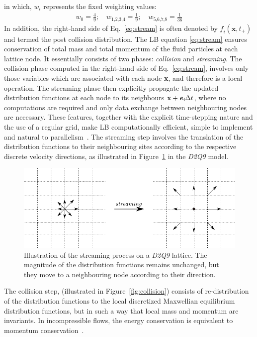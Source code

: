 in which, $\textit{w}_{\textit{i}}$ represents the fixed weighting values:
\begin{align}
\textit{w}_{\textit{0}} = \frac{4}{9}; \quad \textit{w}_{\textit{1,2,3,4}}= \frac{1}{9}; \quad \textit{w}_{\textit{5,6,7,8}}= \frac{1}{36}
\end{align}
In addition, the right-hand side of Eq.~\ref{eq:stream} is often denoted by $\textit{f}_{\textit{i}}(\textbf{x}, \textit{t}_{+})$ and termed the post collision distribution. The LB equation \ref{eq:stream} ensures conservation of total mass and total momentum of the fluid particles at each lattice node. It essentially consists of two phases: \textit{collision} and \textit{streaming}. The collision phase computed in the right-hand side of Eq.~\ref{eq:stream}, involves only those variables which are associated with each node \textbf{x}, and therefore is a local operation. The streaming phase then explicitly propagate the updated distribution functions at each node to its neighbours $\textbf{x}+\textbf{\textit{e}}_{\textit{i}} \Delta t$, where no computations are required and only data exchange between neighbouring nodes are necessary. These features, together with the explicit time-stepping nature and the use of a regular grid, make LB computationally efficient, simple to implement and natural to parallelism~\citep{han2007}. The streaming step involves the translation of the distribution functions to their neighbouring sites according to the respective discrete velocity directions, as illustrated in Figure~\ref{fig:stream} in the \textit{D2Q9} model. 
\clearpage
\begin{figure}[h]
\centering
\includegraphics{Chapter3/figures/lbm/stream.pdf}
\caption[Illustration of the streaming process on a \textit{D2Q9} lattice]{Illustration of the streaming process on a \textit{D2Q9} lattice. The magnitude of the distribution functions remains unchanged, but they move to a neighbouring node according to their direction.}
\label{fig:stream}
\end{figure}
The collision step, (illustrated in Figure~\ref{fig:collision}) consists of re-distribution of the distribution functions to the local discretized Maxwellian equilibrium distribution functions, but in such a way that local mass and momentum are invariants. In incompressible flows, the energy conservation is equivalent to momentum conservation~\citep{he1997}.

